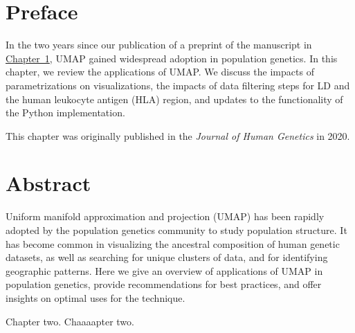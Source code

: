 \setcounter{section}{-1}

\section{Preface}

In the two years since our publication of a preprint of the manuscript in \hyperref[chap:chapter1]{Chapter~1}, UMAP gained widespread adoption in population genetics. In this chapter, we review the applications of UMAP. We discuss the impacts of parametrizations on visualizations, the impacts of data filtering steps for LD and the human leukocyte antigen (HLA) region, and updates to the functionality of the Python implementation.

This chapter was originally published in the \textit{Journal of Human Genetics} in 2020.

\section{Abstract}

Uniform manifold approximation and projection (UMAP) has been rapidly adopted by the population genetics community to study population structure. It has become common in visualizing the ancestral composition of human genetic datasets, as well as searching for unique clusters of data, and for identifying geographic patterns. Here we give an overview of applications of UMAP in population genetics, provide recommendations for best practices, and offer insights on optimal uses for the technique.

Chapter two. Chaaaapter two.\citep{wei_graph_2019}